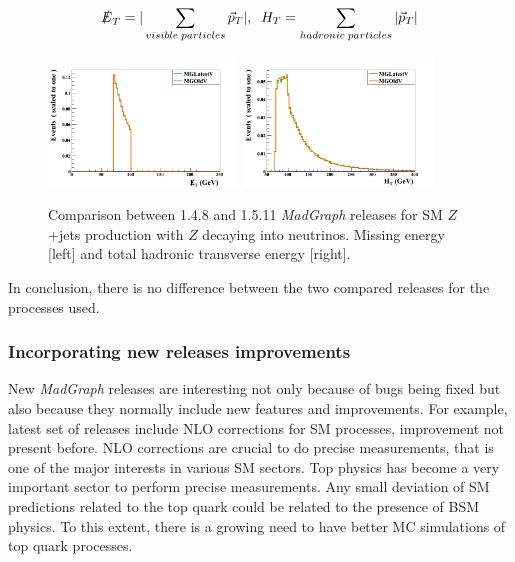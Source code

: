 \begin{equation}
  \label{eq:METHT}
  \slashed{E}_{T}=|\sum_{visible\; particles}\vec{p}_{T}|, \; \; H_{T}=\sum_{hadronic\; particles}|\vec{p}_{T}|
\end{equation}

\begin{figure}[!Hhtbp]
  \begin{center}
    \includegraphics[width=0.45\textwidth]{figs/ZjetsRelVal8.png}
    \includegraphics[width=0.45\textwidth]{figs/ZjetsRelVal9.png}
    \caption{Comparison between 1.4.8 and 1.5.11 \textit{MadGraph} releases for SM $Z$+jets production with $Z$ decaying into neutrinos. Missing energy [left] and total hadronic transverse energy [right].}
    \label{fig:ZRelVal2}
  \end{center}
\end{figure}

In conclusion, there is no difference between the two compared releases for the processes used.

\subsubsection{Incorporating new releases improvements}

New \textit{MadGraph} releases are interesting not only because of bugs being fixed but also because they normally include new features and improvements. For example, latest set of releases include NLO corrections for SM processes, improvement not present before. NLO corrections are crucial to do precise measurements, that is one of the major interests in various SM sectors. Top physics has become a very important sector to perform precise measurements. Any small deviation of SM predictions related to the top quark could be related to the presence of BSM physics. To this extent, there is a growing need to have better MC simulations of top quark processes.

